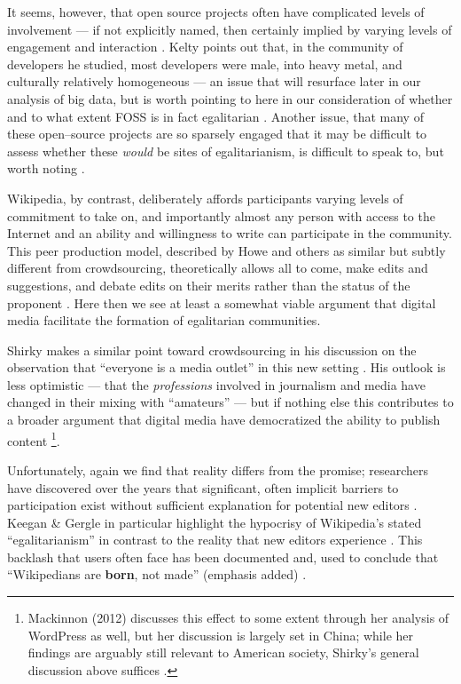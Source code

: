 \documentclass[11pt,titlepage]{article}
\begin{document}
It seems, however, that open source projects often have complicated levels of involvement
--- if not explicitly named, then certainly implied by varying levels of engagement and interaction
\cite{crowston2006core,mockus2002two}.
Kelty points out that, in the community of developers he studied,
most developers were male, into heavy metal, and culturally relatively homogeneous
--- an issue that will resurface later in our analysis of big data,
but is worth pointing to here in our consideration of whether and to what extent FOSS is in fact egalitarian
\cite{kelty2008two}.
Another issue, that many of these open--source projects are so sparsely engaged that
it may be difficult to assess whether these \textit{would} be sites of egalitarianism,
is difficult to speak to, but worth noting
\cite{barcellini2006users}.

Wikipedia, by contrast, deliberately affords participants varying levels of commitment to take on,
and importantly almost any person with access to the Internet and an ability and willingness to write
can participate in the community.
This peer production model,
described by Howe and others as similar but subtly different from crowdsourcing,
theoretically allows all to come,
make edits and suggestions,
and debate edits on their merits rather than the status of the proponent
\cite{howe2008crowdsourcing,atlee2008collective,benkler2013peer}.
Here then we see at least a somewhat viable argument that
digital media facilitate the formation of egalitarian communities.

Shirky makes a similar point toward crowdsourcing in his discussion on the observation that
``everyone is a media outlet'' in this new setting
\cite{shirky2008here}.
His outlook is less optimistic
--- that the \textit{professions} involved in journalism and media have changed
in their mixing with ``amateurs'' ---
but if nothing else this contributes to a broader argument that
digital media have democratized the ability to publish content%
\footnote{%
Mackinnon (2012) discusses this effect to some extent through her analysis of WordPress as well,
but her discussion is largely set in China; while her findings are arguably still relevant
to American society, Shirky's general discussion above suffices
\cite{mackinnon2012consent}.}.

Unfortunately, again we find that reality differs from the promise;
researchers have discovered over the years that significant,
often implicit barriers to participation exist
without sufficient explanation for potential new editors
\cite{halfaker2012rise,zittrain2008future}.
Keegan \& Gergle in particular highlight the hypocrisy of
Wikipedia's stated ``egalitarianism'' in contrast to the reality that new editors experience
\cite{keegan2010egalitarians}.
This backlash that users often face has been documented and,
used to conclude that ``Wikipedians are \textbf{born}, not made'' (emphasis added)
\cite{wikipediansBornNotMade}.
\end{document}
